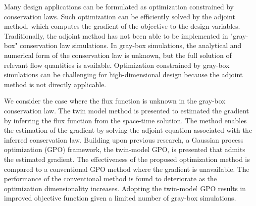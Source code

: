 % 
% 
%


Many design applications can be formulated as optimization constrained by conservation laws. Such optimization can be efficiently solved by the adjoint method, which computes the gradient of the objective to the design variables. Traditionally, the adjoint method has not been able to be implemented in "gray-box" conservation law simulations. In gray-box simulations, the analytical and numerical form of the conservation law is unknown, but the full solution of relevant flow quantities is available. Optimization constrained by gray-box simulations can be challenging for high-dimensional design because the adjoint method is not directly applicable.

We consider the case where the flux function is unknown in the gray-box conservation law. The twin model method is presented to estimated the gradient by inferring the flux function from the space-time solution. The method enables the estimation of the gradient by solving the adjoint equation associated with the inferred conservation law. Building upon previous research, a Gaussian process optimization (GPO) framework, the twin-model GPO,  is presented that admits the estimated gradient. The effectiveness of the proposed optimization method is compared to a conventional GPO method where the gradient is unavailable. The performance of the conventional method is found to deteriorate as the optimization dimensionality increases. Adopting the twin-model GPO results in improved objective function given a limited number of gray-box simulations.

